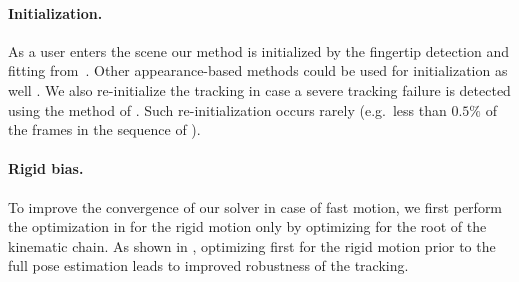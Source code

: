 

\paragraph*{Initialization.} As a user enters the scene our method is initialized by the fingertip detection and fitting from~\cite{qian_cvpr14}.
Other appearance-based methods could be used for initialization as well \cite{tompson_tog14}. We also re-initialize the tracking in case a severe tracking failure is detected using the method of \cite{wei_siga12}. Such re-initialization occurs rarely (e.g.\ less than $0.5\%$ of the frames in the sequence of ).


\paragraph*{Rigid bias.}
To improve the convergence of our solver in case of fast motion, we first perform the optimization in  
for the rigid motion only by optimizing for the root of the kinematic chain. As shown in , optimizing first for the rigid motion prior to the full pose estimation leads to improved robustness of the tracking.

 





